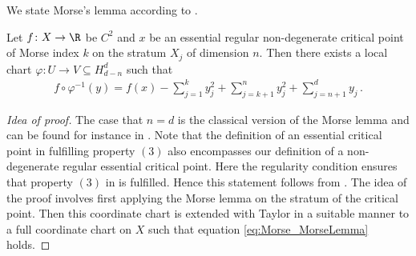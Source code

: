 
We state Morse's lemma according to \cite[Lemma 5]{Handron2002}.
\begin{proposition}
  Let $f\colon X\to\R$ be $C^{2}$ and $x$ be an essential regular non-degenerate
  critical point of Morse index $k$ on the stratum $X_j$ of dimension $n$. Then there exists a
  local chart $\varphi\colon U\to V\subseteq H_{d-n}^d$ such that
  \begin{align}
    f\circ\varphi^{-1}(y)=f(x)-\sum_{j=1}^ky_j^2+\sum_{j=k+1}^ny_j^2+\sum_{j=n+1}^dy_j\,.
    \label{eq:Morse_MorseLemma}
  \end{align}
\end{proposition}
\begin{proof}[Idea of proof]
  The case that $n=d$ is the classical version of the Morse lemma and can be found for instance
  in \cite[§6, Lemma 1.1]{Hirsch1994}.
  Note that the definition of an essential critical point in \cite{Handron2002} 
  fulfilling property $(3)$ also encompasses our definition of a non-degenerate regular
  essential critical point. Here the regularity condition ensures that property $(3)$ in \cite{Handron2002}
  is fulfilled. Hence this statement follows from \cite[Lemma 5]{Handron2002}.
  The idea of the proof involves first applying the Morse lemma on the stratum of the critical point.
  Then this coordinate chart is extended with Taylor in a suitable manner to a
  full coordinate chart on $X$ such that equation \eqref{eq:Morse_MorseLemma} holds.
\end{proof}

